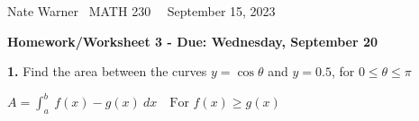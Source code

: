 \documentclass{report}
\title{\Huge{}}
\author{\huge{Nathan Warner}}
\date{\huge{}}
\begin{document}
    \pagebreak \bigbreak \noindent
    Nate Warner \ \quad \quad \quad \quad \quad \quad \quad \quad \quad \quad \quad \quad \quad \quad \quad \quad \quad  MATH 230 \quad  \quad \quad \quad \quad \quad \quad \quad \quad \ \ \quad \quad September 15, 2023
    \begin{center}
        \textbf{Homework/Worksheet 3 - Due: Wednesday, September 20}
    \end{center}
    \bigbreak \noindent 
    \begin{mdframed}
        \textbf{1.} Find the area between the curves $y=\cos{\theta}$ and $y = 0.5$, for $0 \leq \theta \leq \pi$
    \end{mdframed}
    \bigbreak \noindent 
    \begin{remark}
        $A = \int_{a}^{b}\ f(x) - g(x)\ dx \quad \text{For $f(x) \geq g(x)$}$ 
    \end{remark}
    
\end{document}
